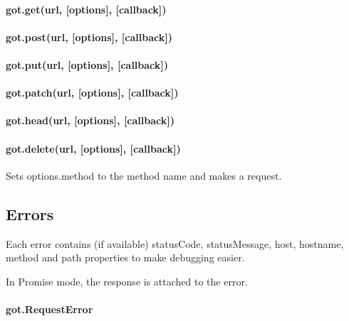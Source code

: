 \paragraph*{got.\+get(url, \mbox{[}options\mbox{]}, \mbox{[}callback\mbox{]})}

\paragraph*{got.\+post(url, \mbox{[}options\mbox{]}, \mbox{[}callback\mbox{]})}

\paragraph*{got.\+put(url, \mbox{[}options\mbox{]}, \mbox{[}callback\mbox{]})}

\paragraph*{got.\+patch(url, \mbox{[}options\mbox{]}, \mbox{[}callback\mbox{]})}

\paragraph*{got.\+head(url, \mbox{[}options\mbox{]}, \mbox{[}callback\mbox{]})}

\paragraph*{got.\+delete(url, \mbox{[}options\mbox{]}, \mbox{[}callback\mbox{]})}

Sets {\ttfamily options.\+method} to the method name and makes a request.

\subsection*{Errors}

Each error contains (if available) {\ttfamily status\+Code}, {\ttfamily status\+Message}, {\ttfamily host}, {\ttfamily hostname}, {\ttfamily method} and {\ttfamily path} properties to make debugging easier.

In Promise mode, the {\ttfamily response} is attached to the error.

\paragraph*{got.\+Request\+Error}

